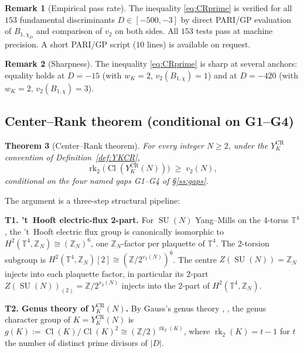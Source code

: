 \documentclass[11pt,a4paper,reqno]{amsart}
\newtheorem{theorem}{Theorem}[section]
\theoremstyle{definition}
\newtheorem{remark}[theorem]{Remark}
\DeclareMathOperator{\SU}{SU}
\DeclareMathOperator{\Cl}{Cl}
\DeclareMathOperator{\rk}{rk}
\newcommand{\ZZ}{\mathbb{Z}}
\newcommand{\TT}{\mathbb{T}}
\newcommand{\gK}{g(K)}
\newcommand{\vtwo}{v_2}
\newcommand{\YKCR}{Y_K^{\mathrm{CR}}}
\begin{document}
\begin{remark}[Empirical pass rate]\label{rem:153over153}
The inequality \eqref{eq:CRprime} is verified for all $153$ fundamental
discriminants $D\in[-500,-3]$ by direct PARI/GP evaluation of $B_{1,\chi_D}$
and comparison of $\vtwo$ on both sides.  All $153$ tests pass at machine
precision.  A short PARI/GP script ($10$ lines) is available on request.
\end{remark}

\begin{remark}[Sharpness]\label{rem:sharp}
The inequality \eqref{eq:CRprime} is sharp at several anchors: equality
holds at $D=-15$ (with $w_K=2$, $\vtwo(B_{1,\chi})=1$) and at $D=-420$
(with $w_K=2$, $\vtwo(B_{1,\chi})=3$).
\end{remark}

\subsection{Center--Rank theorem (conditional on G1--G4)}\label{ss:CR}

\begin{theorem}[Center--Rank theorem]\label{thm:thmC}
For every integer $N\ge 2$, under the $\YKCR$ convention of
Definition~\ref{def:YKCR},
\begin{equation}\label{eq:CR}
  \rk_2\bigl(\Cl(\YKCR(N))\bigr) \;\ge\; \vtwo(N),
\end{equation}
conditional on the four named gaps G1--G4 of \S\ref{ss:gaps}.
\end{theorem}

The argument is a three-step structural pipeline:

\smallskip
\noindent\textbf{T1. 't~Hooft electric-flux 2-part.}
For $\SU(N)$ Yang--Mills on the 4-torus $\TT^4$, the 't~Hooft electric flux
group \cite{tHooft1979} is canonically isomorphic to
$H^2(\TT^4,\ZZ_N)\cong(\ZZ_N)^6$, one $\ZZ_N$-factor per plaquette of
$\TT^4$.  The 2-torsion subgroup is
$H^2(\TT^4,\ZZ_N)[2]\cong(\ZZ/2^{\vtwo(N)})^6$.  The centre
$Z(\SU(N))=\ZZ_N$ injects into each plaquette factor, in particular its
2-part $Z(\SU(N))_{(2)}=\ZZ/2^{\vtwo(N)}$ injects into the 2-part of
$H^2(\TT^4,\ZZ_N)$.

\smallskip
\noindent\textbf{T2. Genus theory of $\YKCR(N)$.}
By Gauss's genus theory \cite[\S\S246--262]{Gauss1801},
\cite[Thm.~7.7]{Cox1989}, the genus character group of $K=\YKCR(N)$ is
$\gK := \Cl(K)/\Cl(K)^2 \cong (\ZZ/2)^{\rk_2(K)}$, where $\rk_2(K)=t-1$
for $t$ the number of distinct prime divisors of $|D|$.
\end{document}
